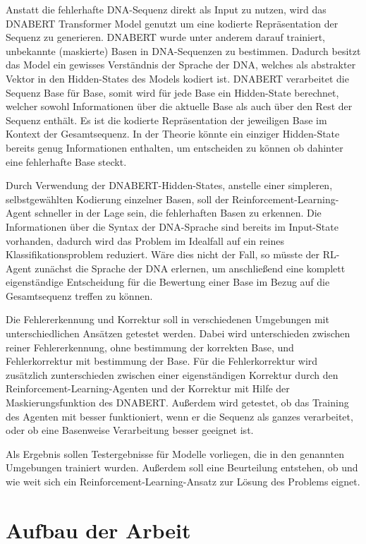 \documentclass[oneside,bibliography=totocnumbered,BCOR=5mm]{scrbook}%
\theoremstyle{definition}
\theoremstyle{definition}
\theoremstyle{definition}
\theoremstyle{definition}
\theoremstyle{definition}
\theoremstyle{definition}
\begin{document}
Anstatt die fehlerhafte DNA-Sequenz direkt als Input zu nutzen, wird das DNABERT Transformer Model genutzt um eine 
kodierte Repräsentation der Sequenz zu generieren. 
DNABERT wurde unter anderem darauf trainiert, unbekannte (maskierte) Basen in DNA-Sequenzen zu bestimmen. 
Dadurch besitzt das Model ein gewisses Verständnis der Sprache der DNA, 
welches als abstrakter Vektor in den Hidden-States des Models kodiert ist. 
DNABERT verarbeitet die Sequenz Base für Base, somit wird für jede Base ein Hidden-State berechnet,
welcher sowohl Informationen über die aktuelle Base als auch über den Rest der Sequenz enthält.
Es ist die kodierte Repräsentation der jeweiligen Base im Kontext der Gesamtsequenz.
In der Theorie könnte ein einziger Hidden-State bereits genug Informationen enthalten, 
um entscheiden zu können ob dahinter eine fehlerhafte Base steckt.


Durch Verwendung der DNABERT-Hidden-States, anstelle einer simpleren, selbstgewählten Kodierung einzelner Basen, 
soll der Reinforcement-Learning-Agent schneller in der Lage sein, die fehlerhaften Basen zu erkennen. 
Die Informationen über die Syntax der DNA-Sprache sind bereits im Input-State vorhanden, 
dadurch wird das Problem im Idealfall auf ein reines Klassifikationsproblem reduziert. 
Wäre dies nicht der Fall, so müsste der RL-Agent zunächst die Sprache der DNA erlernen, 
um anschließend eine komplett eigenständige Entscheidung für die Bewertung einer Base 
im Bezug auf die Gesamtsequenz treffen zu können.


Die Fehlererkennung und Korrektur soll in verschiedenen Umgebungen mit unterschiedlichen Ansätzen
getestet werden. Dabei wird unterschieden zwischen reiner Fehlererkennung, ohne bestimmung der
korrekten Base, und Fehlerkorrektur mit bestimmung der Base. Für die Fehlerkorrektur wird zusätzlich
zunterschieden zwischen einer eigenständigen Korrektur durch den Reinforcement-Learning-Agenten und 
der Korrektur mit Hilfe der Maskierungsfunktion des DNABERT.
Außerdem wird getestet, ob das Training des Agenten mit besser funktioniert, wenn er die Sequenz als ganzes verarbeitet,
oder ob eine Basenweise Verarbeitung besser geeignet ist.


Als Ergebnis sollen Testergebnisse für Modelle vorliegen, die in den genannten Umgebungen trainiert wurden.
Außerdem soll eine Beurteilung entstehen, ob und wie weit sich ein Reinforcement-Learning-Ansatz 
zur Lösung des Problems eignet.



\section{Aufbau der Arbeit}
\end{document}
